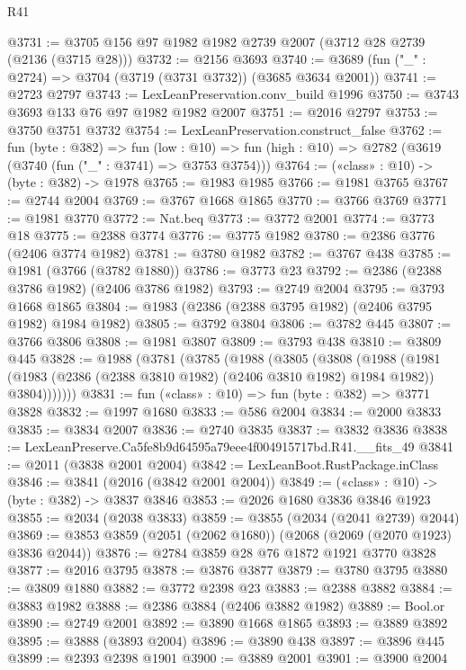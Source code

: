\begin{lexlean}{R41}
\begin{coremodule}
@3731 := @3705 @156 @97 @1982 @1982 @2739 @2007 (@3712 @28 @2739 (@2136 (@3715 @28)))
@3732 := @2156 @3693
@3740 := @3689 (fun ("_" : @2724) => @3704 (@3719 (@3731 @3732)) (@3685 @3634 @2001))
@3741 := @2723 @2797
@3743 := LexLeanPreservation.conv_build @1996
@3750 := @3743 @3693 @133 @76 @97 @1982 @1982 @2007
@3751 := @2016 @2797
@3753 := @3750 @3751 @3732
@3754 := LexLeanPreservation.construct_false
@3762 := fun (byte : @382) =>
  fun (low : @10) => fun (high : @10) => @2782 (@3619 (@3740 (fun ("_" : @3741) => @3753 @3754)))
@3764 := («class» : @10) -> (byte : @382) -> @1978
@3765 := @1983 @1985
@3766 := @1981 @3765
@3767 := @2744 @2004
@3769 := @3767 @1668 @1865
@3770 := @3766 @3769
@3771 := @1981 @3770
@3772 := Nat.beq
@3773 := @3772 @2001
@3774 := @3773 @18
@3775 := @2388 @3774
@3776 := @3775 @1982
@3780 := @2386 @3776 (@2406 @3774 @1982)
@3781 := @3780 @1982
@3782 := @3767 @438
@3785 := @1981 (@3766 (@3782 @1880))
@3786 := @3773 @23
@3792 := @2386 (@2388 @3786 @1982) (@2406 @3786 @1982)
@3793 := @2749 @2004
@3795 := @3793 @1668 @1865
@3804 := @1983 (@2386 (@2388 @3795 @1982) (@2406 @3795 @1982) @1984 @1982)
@3805 := @3792 @3804
@3806 := @3782 @445
@3807 := @3766 @3806
@3808 := @1981 @3807
@3809 := @3793 @438
@3810 := @3809 @445
@3828 := @1988
    (@3781
      (@3785
        (@1988
          (@3805
            (@3808
              (@1988
                (@1981
                  (@1983 (@2386 (@2388 @3810 @1982) (@2406 @3810 @1982) @1984 @1982))
                  @3804)))))))
@3831 := fun («class» : @10) => fun (byte : @382) => @3771 @3828
@3832 := @1997 @1680
@3833 := @586 @2004
@3834 := @2000 @3833
@3835 := @3834 @2007
@3836 := @2740 @3835
@3837 := @3832 @3836
@3838 := LexLeanPreserve.Ca5fe8b9d64595a79eee4f004915717bd.R41.__fits_49
@3841 := @2011 (@3838 @2001 @2004)
@3842 := LexLeanBoot.RustPackage.inClass
@3846 := @3841 (@2016 (@3842 @2001 @2004))
@3849 := («class» : @10) -> (byte : @382) -> @3837 @3846
@3853 := @2026 @1680 @3836 @3846 @1923
@3855 := @2034 (@2038 @3833)
@3859 := @3855 (@2034 (@2041 @2739) @2044)
@3869 := @3853 @3859 (@2051 (@2062 @1680)) (@2068 (@2069 (@2070 @1923) @3836 @2044))
@3876 := @2784 @3859 @28 @76 @1872 @1921 @3770 @3828
@3877 := @2016 @3795
@3878 := @3876 @3877
@3879 := @3780 @3795
@3880 := @3809 @1880
@3882 := @3772 @2398 @23
@3883 := @2388 @3882
@3884 := @3883 @1982
@3888 := @2386 @3884 (@2406 @3882 @1982)
@3889 := Bool.or
@3890 := @2749 @2001
@3892 := @3890 @1668 @1865
@3893 := @3889 @3892
@3895 := @3888 (@3893 @2004)
@3896 := @3890 @438
@3897 := @3896 @445
@3899 := @2393 @2398 @1901
@3900 := @3889 @2001
@3901 := @3900 @2004

\end{coremodule}
\end{lexlean}
